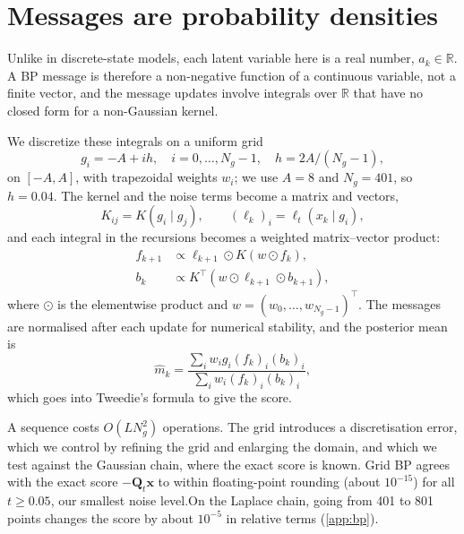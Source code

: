 \section{Messages are probability densities}
\label{sec:grid}

Unlike in discrete-state models, each latent variable here is a real number, $a_k\in\mathbb R$. A BP message is
therefore a non-negative function of a continuous variable, not a finite vector, and the message updates involve
integrals over $\mathbb R$ that have no closed form for a non-Gaussian kernel.

We discretize these integrals on a uniform grid
\begin{equation}
    g_i=-A+ih,\quad i=0,\ldots,N_g-1,\quad h=2A/(N_g-1),
\end{equation}
on $[-A,A]$, with trapezoidal weights $w_i$; we use $A=8$ and $N_g=401$, so $h=0.04$. The kernel and the noise terms
become a matrix and vectors,
\begin{equation}
    K_{ij}=K(g_i\mid g_j),
    \qquad
    (\ell_k)_i=\ell_t(x_k\mid g_i),
\end{equation}
and each integral in the recursions becomes a weighted matrix--vector product:
\begin{align}
    f_{k+1}
    &\propto
    \ell_{k+1}\odot K(w\odot f_k),\\
    b_k
    &\propto
    K^\top(w\odot\ell_{k+1}\odot b_{k+1}),
\end{align}
where $\odot$ is the elementwise product and $w=(w_0,\ldots,w_{N_g-1})^\top$. The messages are normalised after each
update for numerical stability, and the posterior mean is
\begin{equation}
    \widehat m_k
    =
    \frac{\sum_i w_i g_i(f_k)_i(b_k)_i}
         {\sum_i w_i(f_k)_i(b_k)_i},
\end{equation}
which goes into Tweedie's formula to give the score.

A sequence costs $O(LN_g^2)$ operations. The grid introduces a discretisation error, which we control by refining the
grid and enlarging the domain, and which we test against the Gaussian chain, where the exact score is known.
Grid BP agrees with the exact score $-\mathbf Q_t\mathbf x$ to within floating-point
rounding (about $10^{-15}$) for all $t\geq0.05$, our smallest noise level.On the
Laplace chain, going from 401 to 801 points changes the score by about $10^{-5}$ in relative terms (\cref{app:bp}).

